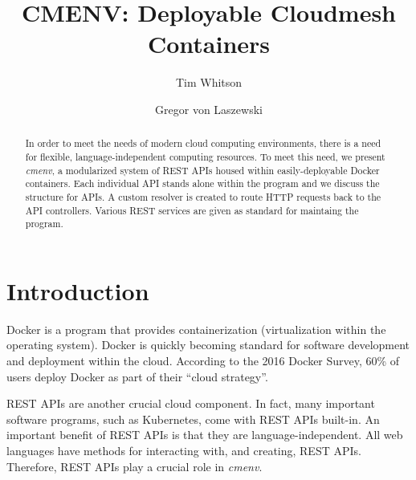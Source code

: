
\title{CMENV: Deployable Cloudmesh Containers}

\author{Tim Whitson}

\author{Gregor von Laszewski}

\renewcommand{\shortauthors}{T. Whitson}

\def\projectname{\textit{cmenv}}

\begin{abstract}
In order to meet the needs of modern cloud computing environments, there is a
need for flexible, language-independent computing resources. To meet this
need, we present \projectname, a modularized system of REST APIs housed
within easily-deployable Docker containers. Each individual API stands alone
within the program and we discuss the structure for APIs. A custom resolver
is created to route HTTP requests back to the API controllers. Various REST
services are given as standard for maintaing the program.
\end{abstract}


\maketitle

\section{Introduction}

Docker is a program that provides containerization (virtualization
within the operating system). Docker is quickly becoming standard for
software development and deployment within the cloud. According to the
2016 Docker Survey, 60\% of users deploy Docker as part of their ``cloud
strategy''\cite{hid-sp18-526-www-docker-survey}.

REST APIs are another crucial cloud component. In fact, many important software
programs, such as Kubernetes, come with REST APIs built-in. An important
benefit of REST APIs is that they are language-independent. All web languages
have methods for interacting with, and creating, REST APIs. Therefore, REST
APIs play a crucial role in \projectname.

